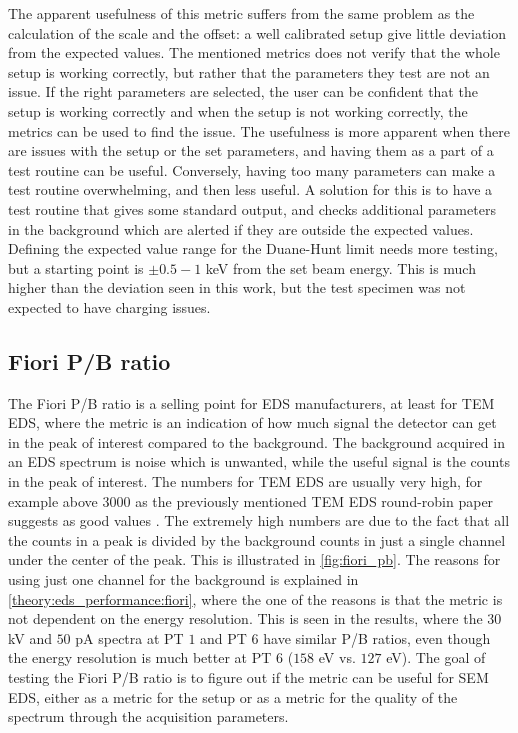 The apparent usefulness of this metric suffers from the same problem as the calculation of the scale and the offset: a well calibrated setup give little deviation from the expected values.
The mentioned metrics does not verify that the whole setup is working correctly, but rather that the parameters they test are not an issue.
If the right parameters are selected, the user can be confident that the setup is working correctly and when the setup is not working correctly, the metrics can be used to find the issue.
The usefulness is more apparent when there are issues with the setup or the set parameters, and having them as a part of a test routine can be useful.
Conversely, having too many parameters can make a test routine overwhelming, and then less useful.
A solution for this is to have a test routine that gives some standard output, and checks additional parameters in the background which are alerted if they are outside the expected values.
Defining the expected value range for the Duane-Hunt limit needs more testing, but a starting point is $\pm 0.5-1$ keV from the set beam energy.
This is much higher than the deviation seen in this work, but the test specimen was not expected to have charging issues.




\subsection{Fiori P/B ratio}
\label{discussion:fiori_peak_to_background_ratio}

The Fiori P/B ratio is a selling point for EDS manufacturers, at least for TEM EDS, where the metric is an indication of how much signal the detector can get in the peak of interest compared to the background.
The background acquired in an EDS spectrum is noise which is unwanted, while the useful signal is the counts in the peak of interest.
The numbers for TEM EDS are usually very high, for example above $3000$ as the previously mentioned TEM EDS round-robin paper suggests as good values \cite{bennett_egerton_1995,ted_pella_nio_tem_2019}.
The extremely high numbers are due to the fact that all the counts in a peak is divided by the background counts in just a single channel under the center of the peak.
This is illustrated in \cref{fig:fiori_pb}.
The reasons for using just one channel for the background is explained in \cref{theory:eds_performance:fiori}, where the one of the reasons is that the metric is not dependent on the energy resolution.
This is seen in the results, where the $30$ kV and $50$ pA spectra at PT $1$ and PT $6$ have similar P/B ratios, even though the energy resolution is much better at PT $6$ ($158$ eV vs. $127$ eV).
The goal of testing the Fiori P/B ratio is to figure out if the metric can be useful for SEM EDS, either as a metric for the setup or as a metric for the quality of the spectrum through the acquisition parameters.


